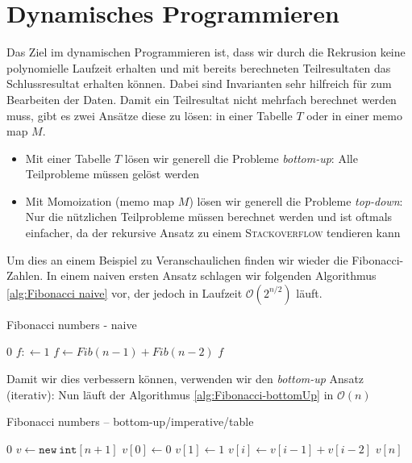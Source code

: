 \documentclass[a4paper]{article}
\begin{document}
\section{Dynamisches Programmieren}
Das Ziel im dynamischen Programmieren ist, dass wir durch die Rekrusion keine polynomielle Laufzeit erhalten und mit bereits berechneten Teilresultaten das Schlussresultat erhalten können. Dabei sind Invarianten sehr hilfreich für zum Bearbeiten der Daten. Damit ein Teilresultat nicht mehrfach berechnet werden muss, gibt es zwei Ansätze diese zu lösen: in einer Tabelle $T$ oder in einer memo map $M$.
\begin{itemize}
    \item Mit einer Tabelle $T$ lösen wir generell die Probleme \textit{bottom-up}:   Alle Teilprobleme müssen gelöst werden 
    \item Mit Momoization (memo map $M$) lösen wir generell die Probleme \textit{top-down}: Nur die nützlichen Teilprobleme müssen berechnet werden und ist oftmals einfacher, da der rekursive Ansatz zu einem \textsc{Stackoverflow} tendieren kann
\end{itemize}
Um dies an einem Beispiel zu Veranschaulichen finden wir wieder die Fibonacci-Zahlen. In einem naiven ersten Ansatz schlagen wir folgenden Algorithmus \ref{alg:Fibonacci naive} vor, der jedoch in Laufzeit $\mathcal{O}(2^{n/2})$ läuft.
\begin{algorithm}[h]
\caption{Fibonacci numbers - naive}
\label{alg:Fibonacci naive}
\begin{algorithmic}
    \State \Return $0$
  \EndIf
    \State $f: \gets 1$  
  \Else
     \State $f \gets Fib(n-1) + Fib(n-2)$
  \EndIf
  \State \Return $f$
\EndFunction
\end{algorithmic}
\end{algorithm}

Damit wir dies verbessern können, verwenden wir den \textit{bottom-up} Ansatz (iterativ): Nun läuft der Algorithmus \ref{alg:Fibonacci-bottomUp} in $\mathcal{O}(n)$

\begin{algorithm}[h]
\caption{Fibonacci numbers -- bottom-up/imperative/table}
 \label{alg:Fibonacci-bottomUp}
\begin{algorithmic}
  \State \Return $0$
  \EndIf
  \State $v \gets \texttt{new}~\texttt{int}\left[n+1\right]$
  \State $v\left[0\right] \gets 0$
  \State $v\left[1\right] \gets 1$
  \State $v\left[i\right] \gets v\left[i-1\right] + v\left[i-2\right]$
  \EndFor
  \State \Return $v\left[n\right]$
  \EndFunction
\end{algorithmic}
 
\end{algorithm}
\end{document}
